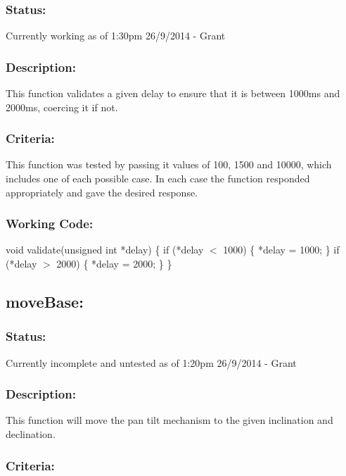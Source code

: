 \documentclass[]{article}
\begin{document}
\subsubsection{Status:}
Currently working as of 1:30pm 26/9/2014 - Grant

\subsubsection{Description:}
This function validates a given delay to ensure that it is between 1000ms and 2000ms, coercing it if not.

\subsubsection{Criteria:}
This function was tested by passing it values of 100, 1500 and 10000, which includes one of each possible case. In each case the function responded appropriately and gave the desired response.

\subsubsection{Working Code:}
void validate(unsigned int *delay) \newline
\{ \newline
	if (*delay $<$ 1000) \newline
	\{ \newline
		*delay = 1000; \newline
	\} \newline
	if (*delay $>$ 2000) \newline
	\{ \newline
		*delay = 2000; \newline
	\} \newline
\}\newline

\subsection{moveBase:}
\subsubsection{Status:}
Currently incomplete and untested as of 1:20pm 26/9/2014 - Grant

\subsubsection{Description:} 
This function will move the pan tilt mechanism to the given inclination and declination.

\subsubsection{Criteria:}

\newpage
\end{document}
